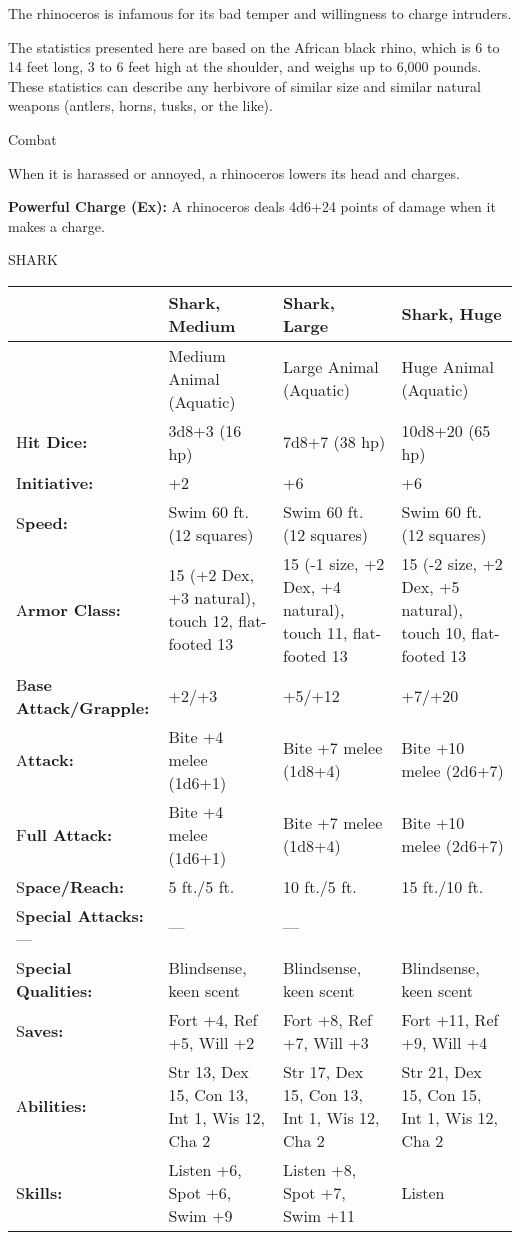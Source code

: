 \documentclass{article}
\begin{document}
The rhinoceros is infamous for its bad temper and willingness to charge intruders.

The statistics presented here are based on the African black rhino, which is 6 
to 14 feet long, 3 to 6 feet high at the shoulder, and weighs up to 6,000 pounds. 
These statistics can describe any herbivore of similar size and similar natural 
weapons (antlers, horns, tusks, or the like).

Combat

When it is harassed or annoyed, a rhinoceros lowers its head and charges.

\textbf{Powerful Charge (Ex):} A rhinoceros deals 4d6+24 points of damage when 
it makes a charge.

\vspace{12pt}
SHARK

\begin{tabular}{|>{\raggedright}p{53pt}|>{\raggedright}p{82pt}|>{\raggedright}p{82pt}|>{\raggedright}p{82pt}|}
\hline
  & S\textbf{hark, Medium} & S\textbf{hark, Large} & S\textbf{hark, Huge}\tabularnewline
\hline
  & Medium Animal (Aquatic) & Large Animal (Aquatic) & Huge Animal (Aquatic)\tabularnewline
\hline
H\textbf{it Dice:} & 3d8+3 (16 hp) & 7d8+7 (38 hp) & 10d8+20 (65 hp)\tabularnewline
\hline
I\textbf{nitiative:} & +2 & +6 & +6\tabularnewline
\hline
S\textbf{peed:} & Swim 60 ft. (12 squares) & Swim 60 ft. (12 squares) & Swim 60 
ft. (12 squares)\tabularnewline
\hline
A\textbf{rmor Class:} & 15 (+2 Dex, +3 natural), touch 12, flat-footed 13 & 15 
(-1 size, +2 Dex, +4 natural), touch 11, flat-footed 13 & 15 (-2 size, +2 Dex, 
+5 natural), touch 10, flat-footed 13\tabularnewline
\hline
B\textbf{ase Attack/Grapple:} & +2/+3 & +5/+12 & +7/+20\tabularnewline
\hline
A\textbf{ttack:} & Bite +4 melee (1d6+1) & Bite +7 melee (1d8+4) & Bite +10 melee 
(2d6+7)\tabularnewline
\hline
F\textbf{ull Attack:} & Bite +4 melee (1d6+1) & Bite +7 melee (1d8+4) & Bite +10 
melee (2d6+7)\tabularnewline
\hline
S\textbf{pace/Reach:} & 5 ft./5 ft. & 10 ft./5 ft. & 15 ft./10 ft.\tabularnewline
\hline
S\textbf{pecial Attacks:}--- & --- & --- & \tabularnewline
\hline
S\textbf{pecial Qualities:} & Blindsense, keen scent & Blindsense, keen scent & Blindsense, 
keen scent\tabularnewline
\hline
S\textbf{aves:} & Fort +4, Ref +5, Will +2 & Fort +8, Ref +7, Will +3 & Fort +11, 
Ref +9, Will +4\tabularnewline
\hline
A\textbf{bilities:} & Str 13, Dex 15, Con 13, Int 1, Wis 12, Cha 2 & Str 17, Dex 
15, Con 13, Int 1, Wis 12, Cha 2 & Str 21, Dex 15, Con 15, Int 1, Wis 12, Cha 2\tabularnewline
\hline
S\textbf{kills:} & Listen +6, Spot +6, Swim +9 & Listen +8, Spot +7, Swim +11 & Listen 

\end{tabular}
\end{document}
